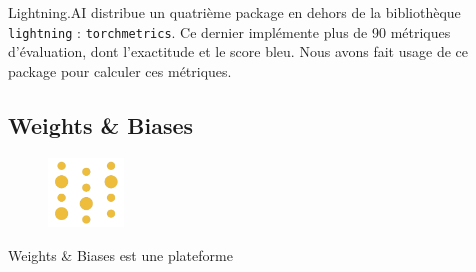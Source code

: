 \foreignlanguage{english}{Lightning.AI} distribue un quatrième package en dehors de la bibliothèque \verb|lightning| :
\verb|torchmetrics|.
Ce dernier implémente plus de 90 métriques d'évaluation, dont l'exactitude et le score \gls{bleu}.
Nous avons fait usage de ce package pour calculer ces métriques.

\subsection{\foreignlanguage{english}{Weights \& Biases}}
\label{subsec.wandb}

\begin{figure}
    \vspace*{-\topsep}
    \begin{flushright}
        \includegraphics[width=2cm]{assets/images/wandb.png}
    \end{flushright}
\end{figure}
\foreignlanguage{english}{Weights \& Biases} est une plateforme